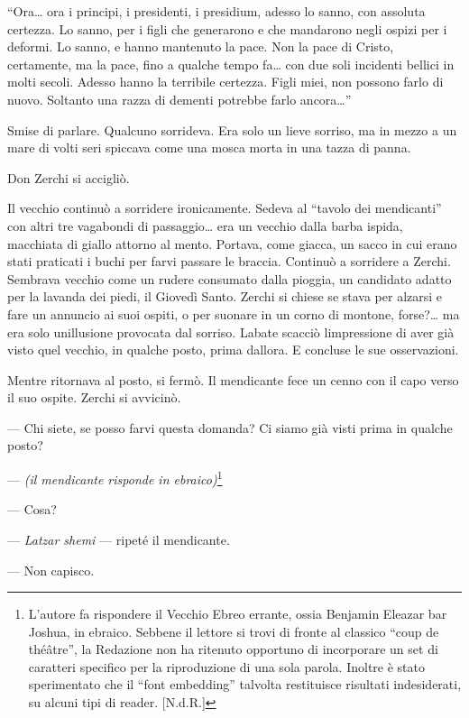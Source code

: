 ``Ora\ldots{} ora i principi, i presidenti, i presidium, adesso lo
sanno, con assoluta certezza. Lo sanno, per i figli che generarono e che
mandarono negli ospizi per i deformi. Lo sanno, e hanno mantenuto la
pace. Non la pace di Cristo, certamente, ma la pace, fino a qualche
tempo fa\ldots{} con due soli incidenti bellici in molti secoli. Adesso
hanno la terribile certezza. Figli miei, non possono farlo di nuovo.
Soltanto una razza di dementi potrebbe farlo ancora\ldots''

Smise di parlare. Qualcuno sorrideva. Era solo un lieve sorriso, ma in
mezzo a un mare di volti seri spiccava come una mosca morta in una tazza
di panna.

Don Zerchi si accigliò.

Il vecchio continuò a sorridere ironicamente. Sedeva al ``tavolo dei
mendicanti'' con altri tre vagabondi di passaggio\ldots{} era un vecchio
dalla barba ispida, macchiata di giallo attorno al mento. Portava, come
giacca, un sacco in cui erano stati praticati i buchi per farvi passare
le braccia. Continuò a sorridere a Zerchi. Sembrava vecchio come un
rudere consumato dalla pioggia, un candidato adatto per la lavanda dei
piedi, il Giovedì Santo. Zerchi si chiese se stava per alzarsi e fare un
annuncio ai suoi ospiti, o per suonare in un corno di montone,
forse?\ldots{} ma era solo un\textquotesingle illusione provocata dal
sorriso. L\textquotesingle abate scacciò l\textquotesingle impressione
di aver già visto quel vecchio, in qualche posto, prima
d\textquotesingle allora. E concluse le sue osservazioni.

Mentre ritornava al posto, si fermò. Il mendicante fece un cenno con il
capo verso il suo ospite. Zerchi si avvicinò.

--- Chi siete, se posso farvi questa domanda? Ci siamo già visti prima
in qualche posto?

--- \emph{(il mendicante risponde in
	ebraico)}\footnote{L'autore fa rispondere il Vecchio Ebreo errante, ossia Benjamin Eleazar bar Joshua, in ebraico. Sebbene il lettore si trovi di fronte al classico “coup de théâtre”, la Redazione non ha ritenuto opportuno di incorporare un set di caratteri specifico per la riproduzione di una sola parola. Inoltre è stato sperimentato che il “font embedding” talvolta restituisce risultati indesiderati, su alcuni tipi di reader. [N.d.R.]}

--- Cosa?

--- \emph{Latzar shemi} --- ripeté il mendicante.

--- Non capisco.


